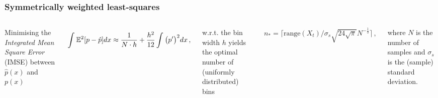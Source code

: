 \documentclass[./main.tex]{subfiles}
\begin{document}
\begin{frame}[t, label=slide14]
        \frametitle{Symmetrically weighted least-squares}

        \footnotesize

        \begin{columns}[T]
                

                Minimising the \textit{Integrated Mean Square Error} (IMSE) between $\hat{p}(x)$ and $p(x)$
                
                \vspace{-0.35cm}

                \begin{equation*}
                        \int_{}^{}\mathbb{E}^{2}[p-\hat{p}]dx \approx \frac{1}{N\cdot h} + \frac{h^{2}}{12}\int_{}^{}\big(p'\big)^{2}dx\,, 
                \end{equation*}

                w.r.t. the bin width $h$ yields the optimal number of (uniformly distributed) bins

                \vspace{-0.35cm}

                \begin{equation*}
                        n_{*} = \bigg\lceil \text{range}(X_{t})/\sigma_{s}\sqrt{24\sqrt{\pi}}N^{-\frac{1}{3}} \bigg\rceil \,, 
                \end{equation*}
                
                where $N$ is the number of samples and $\sigma_{s}$ is the (sample) standard deviation.



\end{columns}
\end{frame}
\end{document}
